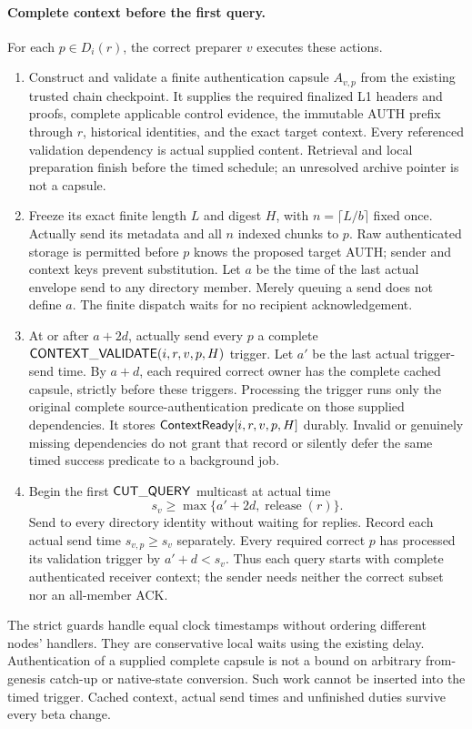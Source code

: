 \paragraph{Complete context before the first query.}
For each $p\in D_i(r)$, the correct preparer $v$ executes these actions.
\begin{enumerate}[label=(\arabic*),itemsep=3pt]
\item Construct and validate a finite authentication capsule $A_{v,p}$
from the existing trusted chain checkpoint. It supplies the required
finalized L1 headers and proofs, complete applicable control evidence,
the immutable AUTH prefix through $r$, historical identities, and the
exact target context. Every referenced validation dependency is actual
supplied content. Retrieval and local preparation finish before the
timed schedule; an unresolved archive pointer is not a capsule.
\item Freeze its exact finite length $L$ and digest $H$, with
$n=\lceil L/b\rceil$ fixed once. Actually send its metadata and all
$n$ indexed chunks to $p$. Raw authenticated storage is permitted
before $p$ knows the proposed target AUTH; sender and context keys
prevent substitution. Let $a$ be the time of the last actual envelope
send to any directory member. Merely queuing a send does not define
$a$. The finite dispatch waits for no recipient acknowledgement.
\item At or after $a+2d$, actually send every $p$ a complete
$\mathsf{CONTEXT\_VALIDATE}(i,r,v,p,H)$ trigger. Let $a'$ be the last
actual trigger-send time. By $a+d$, each required correct owner has
the complete cached capsule, strictly before these triggers. Processing
the trigger runs only the original complete source-authentication
predicate on those supplied dependencies. It stores
$\mathsf{ContextReady}[i,r,v,p,H]$ durably. Invalid or genuinely missing
dependencies do not grant that record or silently defer the same
timed success predicate to a background job.
\item Begin the first $\mathsf{CUT\_QUERY}$ multicast at actual time
\[
 s_v\ge\max\{a'+2d,\operatorname{release}(r)\}.
\]
Send to every directory identity without waiting for replies. Record
each actual send time $s_{v,p}\ge s_v$ separately. Every required
correct $p$ has processed its validation trigger by $a'+d<s_v$.
Thus each query starts with complete authenticated receiver context;
the sender needs neither the correct subset nor an all-member ACK.
\end{enumerate}
The strict guards handle equal clock timestamps without ordering
different nodes' handlers. They are conservative local waits using the
existing delay. Authentication of a supplied complete capsule is not a
bound on arbitrary from-genesis catch-up or native-state conversion.
Such work cannot be inserted into the timed trigger. Cached context,
actual send times and unfinished duties survive every beta change.

